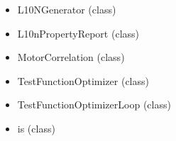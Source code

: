 \documentclass{amsdtx}
\begin{document}
\begin{itemize}
\begin{itemize}
    \begin{itemize}
    
    \item
      L10NGenerator (class)
    \item
      L10nPropertyReport (class)
    \item
      MotorCorrelation (class)
    \item
      TestFunctionOptimizer (class)
    \item
      TestFunctionOptimizerLoop (class)
    \item
      is (class)
    \end{itemize}
  \end{itemize}
\end{itemize}

	
\end{document}
